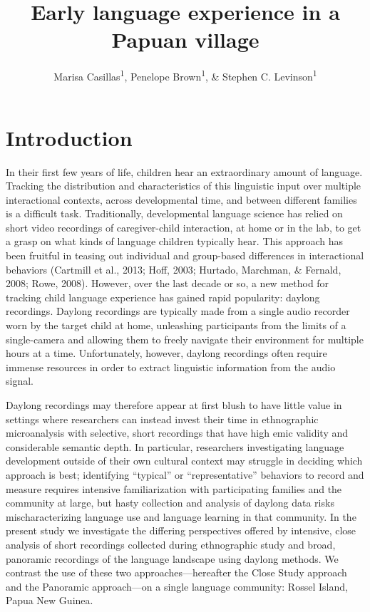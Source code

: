 \documentclass[,man,floatsintext]{apa6}
\title{Early language experience in a Papuan village}
\author{Marisa Casillas\textsuperscript{1}, Penelope Brown\textsuperscript{1},
\& Stephen C. Levinson\textsuperscript{1}}
\date{}
\affiliation{
\vspace{0.5cm}
\textsuperscript{1} Max Planck Institute for Psycholinguistics}
\begin{document}
\maketitle

\section{Introduction}\label{intro}

In their first few years of life, children hear an extraordinary amount
of language. Tracking the distribution and characteristics of this
linguistic input over multiple interactional contexts, across
developmental time, and between different families is a difficult task.
Traditionally, developmental language science has relied on short video
recordings of caregiver-child interaction, at home or in the lab, to get
a grasp on what kinds of language children typically hear. This approach
has been fruitful in teasing out individual and group-based differences
in interactional behaviors (Cartmill et al., 2013; Hoff, 2003; Hurtado,
Marchman, \& Fernald, 2008; Rowe, 2008). However, over the last decade
or so, a new method for tracking child language experience has gained
rapid popularity: daylong recordings. Daylong recordings are typically
made from a single audio recorder worn by the target child at home,
unleashing participants from the limits of a single-camera and allowing
them to freely navigate their environment for multiple hours at a time.
Unfortunately, however, daylong recordings often require immense
resources in order to extract linguistic information from the audio
signal.

Daylong recordings may therefore appear at first blush to have little
value in settings where researchers can instead invest their time in
ethnographic microanalysis with selective, short recordings that have
high emic validity and considerable semantic depth. In particular,
researchers investigating language development outside of their own
cultural context may struggle in deciding which approach is best;
identifying \enquote{typical} or \enquote{representative} behaviors to
record and measure requires intensive familiarization with participating
families and the community at large, but hasty collection and analysis
of daylong data risks mischaracterizing language use and language
learning in that community. In the present study we investigate the
differing perspectives offered by intensive, close analysis of short
recordings collected during ethnographic study and broad, panoramic
recordings of the language landscape using daylong methods. We contrast
the use of these two approaches---hereafter the Close Study approach and
the Panoramic approach---on a single language community: Rossel Island,
Papua New Guinea.
\end{document}
